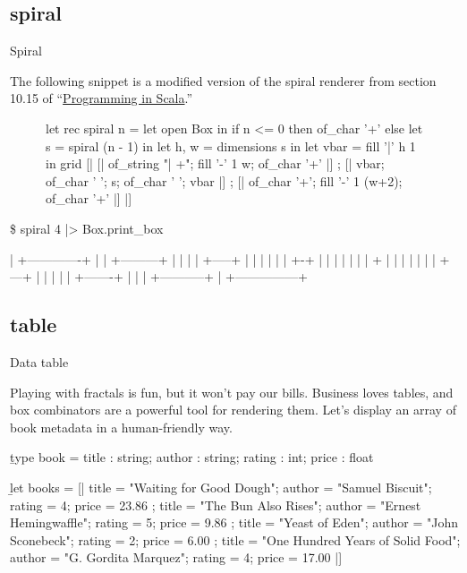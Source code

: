 \documentclass{article}
\begin{document}
\subsection{spiral}{Spiral}

The following snippet is a modified version of the spiral renderer from section 10.15 of ``\href{https://www.goodreads.com/book/show/5680904-programming-in-scala}{Programming in Scala}.''

\begin{figure}
\begin{code}[ocaml]
let rec spiral n =
    let open Box in
    if n <= 0
    then of_char '+'
    else let s = spiral (n - 1) in
         let h, w = dimensions s in
         let vbar = fill '|' h 1 in
         grid [| [| of_string "| +"; fill '-' 1 w; of_char '+' |]
               ; [| vbar; of_char ' '; s; of_char ' '; vbar |]
               ; [| of_char '+'; fill '-' 1 (w+2); of_char '+' |] |]
\end{code}
\end{figure}

\begin{code}[text]
\$ spiral 4 |> Box.print_box

| +-------------+
| | +---------+ |
| | | +-----+ | |
| | | | +-+ | | |
| | | | + | | | |
| | | +---+ | | |
| | +-------+ | |
| +-----------+ |
+---------------+
\end{code}

\subsection{table}{Data table}

Playing with fractals is fun, but it won't pay our bills.
Business loves tables, and box combinators are a powerful tool for rendering them.
Let's display an array of book metadata in a human-friendly way.

\begin{code}[ocaml]
\b{type} book = { title : string;
              author : string;
              rating : int;
              price : float }

\b{let} books = [| { title = "Waiting for Good Dough";
                 author = "Samuel Biscuit";
                 rating = 4;
                 price = 23.86 };
               { title = "The Bun Also Rises";
                 author = "Ernest Hemingwaffle";
                 rating = 5;
                 price = 9.86 };
               { title = "Yeast of Eden";
                 author = "John Sconebeck";
                 rating = 2;
                 price = 6.00 };
               { title = "One Hundred Years of Solid Food";
                 author = "G. Gordita Marquez";
                 rating = 4;
                 price = 17.00 }
             |]
\end{code}
\end{document}
